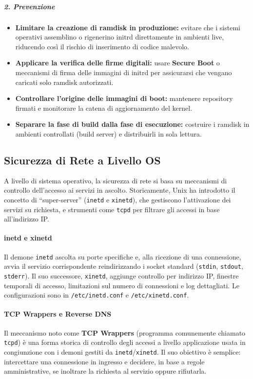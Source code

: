 \subparagraph{2. Prevenzione}
\begin{itemize}
  \item \textbf{Limitare la creazione di ramdisk in produzione:} evitare che i sistemi operativi assemblino o rigenerino initrd direttamente in ambienti live, riducendo così il rischio di inserimento di codice malevolo.
  \item \textbf{Applicare la verifica delle firme digitali:} usare \textbf{Secure Boot} o meccanismi di firma delle immagini di initrd per assicurarsi che vengano caricati solo ramdisk autorizzati.
  \item \textbf{Controllare l’origine delle immagini di boot:} mantenere repository firmati e monitorare la catena di aggiornamento del kernel.
  \item \textbf{Separare la fase di build dalla fase di esecuzione:} costruire i ramdisk in ambienti controllati (build server) e distribuirli in sola lettura.
\end{itemize}


\subsection{Sicurezza di Rete a Livello OS}
A livello di sistema operativo, la sicurezza di rete si basa su meccanismi di controllo dell’accesso ai servizi in ascolto.
Storicamente, Unix ha introdotto il concetto di “super-server” (\texttt{inetd} e \texttt{xinetd}), che gestiscono l’attivazione dei servizi su richiesta, e strumenti come \texttt{tcpd} per filtrare gli accessi in base all’indirizzo IP.

\paragraph{inetd e xinetd}
Il demone \texttt{inetd} ascolta su porte specifiche e, alla ricezione di una connessione, avvia il servizio corrispondente reindirizzando i socket standard (\texttt{stdin}, \texttt{stdout}, \texttt{stderr}).
Il suo successore, \texttt{xinetd}, aggiunge controllo per indirizzo IP, finestre temporali di accesso, limitazioni sul numero di connessioni e log dettagliati.
Le configurazioni sono in \texttt{/etc/inetd.conf} e \texttt{/etc/xinetd.conf}.

\paragraph{TCP Wrappers e Reverse DNS}
Il meccanismo noto come \textbf{TCP Wrappers} (programma comunemente chiamato \texttt{tcpd}) è una forma storica di controllo degli accessi a livello applicazione usata in congiunzione con i demoni gestiti da \texttt{inetd}/\texttt{xinetd}.
Il suo obiettivo è semplice: intercettare una connessione in ingresso e decidere, in base a regole amministrative, se inoltrare la richiesta al servizio oppure rifiutarla.


